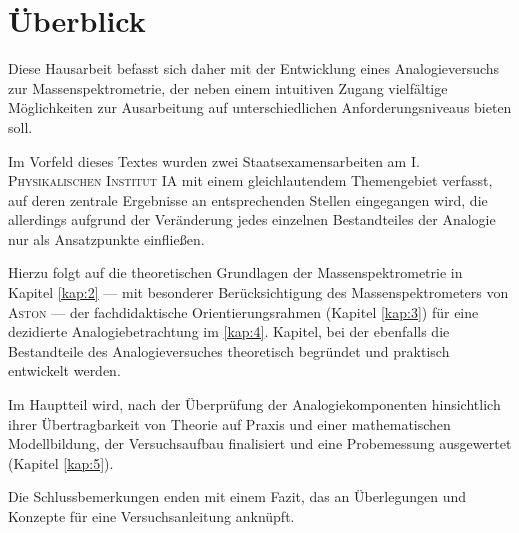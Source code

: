 \section{Überblick}
Diese Hausarbeit befasst sich daher mit der Entwicklung eines Analogieversuchs zur Massenspektrometrie, der neben einem intuitiven Zugang vielfältige Möglichkeiten zur Ausarbeitung auf unterschiedlichen Anforderungsniveaus bieten soll.\par
Im Vorfeld dieses Textes wurden zwei Staatsexamensarbeiten am \textsc{I.\,Physikalischen Institut IA} mit einem gleichlautendem Themengebiet verfasst, auf deren zentrale Ergebnisse an entsprechenden Stellen eingegangen wird, die allerdings aufgrund der Veränderung jedes einzelnen Bestandteiles der Analogie nur als Ansatzpunkte einfließen.\par 
Hierzu folgt auf die theoretischen Grundlagen der Massenspektrometrie in Kapitel \ref{kap:2} --- mit besonderer Berücksichtigung des Massenspektrometers von \textsc{Aston} --- der fachdidaktische Orientierungsrahmen (Kapitel \ref{kap:3}) für eine dezidierte Analogiebetrachtung im \ref{kap:4}. Kapitel, bei der ebenfalls die Bestandteile des Analogieversuches theoretisch begründet und praktisch entwickelt werden.\par
Im Hauptteil wird, nach der Überprüfung der Analogiekomponenten hinsichtlich ihrer Übertragbarkeit von Theorie auf Praxis und einer mathematischen Modellbildung, der Versuchsaufbau finalisiert und eine Probemessung ausgewertet (Kapitel \ref{kap:5}).\par
Die Schlussbemerkungen enden mit einem Fazit, das an Überlegungen und Konzepte für eine Versuchsanleitung anknüpft.



